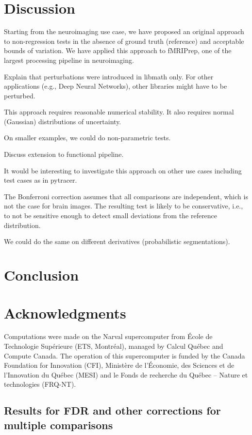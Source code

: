 \documentclass{article}
\begin{document}
\section{Discussion}
Starting from the neuroimaging use case, we have proposed an original approach
to non-regression tests in the absence of ground truth (reference) and
acceptable bounds of variation. We have applied this approach to fMRIPrep, one
of the largest processing pipeline in neuroimaging.

Explain that perturbations were introduced in libmath only. For other
applications (e.g., Deep Neural Networks), other libraries might have to be
perturbed.

This approach requires reasonable numerical stability. It also requires normal
(Gaussian) distributions of uncertainty.

On smaller examples, we could do non-parametric tests.

Discuss extension to functional pipeline.

It would be interesting to investigate this approach on other use cases
including test cases as in pytracer.

The Bonferroni correction assumes that all comparisons are independent, which is
not the case for brain images. The resulting test is likely to be conservative,
i.e., to not be sensitive enough to detect small deviations from the reference
distribution.

We could do the same on different derivatives (probabilistic segmentations).

\section{Conclusion}
\section{Acknowledgments}

Computations were made on the Narval supercomputer from \'Ecole de Technologie
Sup\'erieure (ETS, Montr\'eal), managed by Calcul Québec and Compute Canada. The
operation of this supercomputer is funded by the Canada Foundation for
Innovation (CFI), Ministère de l’Économie, des Sciences et de l’Innovation du
Québec (MESI) and le Fonds de recherche du Québec – Nature et technologies
(FRQ-NT).


\begin{appendices}
    \section{Results for FDR and other corrections for multiple comparisons}
    \label{appendix:multiple-comparison-tests}
\end{appendices}




\end{document}
